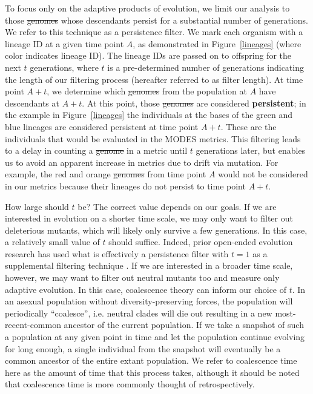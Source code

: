 \documentclass[letterpaper]{article}
\providecommand{\DIFaddtex}[1]{{\protect\color{blue}\uwave{#1}}} %
\providecommand{\DIFdeltex}[1]{{\protect\color{red}\sout{#1}}}                      %
\providecommand{\DIFaddbegin}{} %
\providecommand{\DIFaddend}{} %
\providecommand{\DIFdelbegin}{} %
\providecommand{\DIFdelend}{} %
\providecommand{\DIFadd}[1]{\texorpdfstring{\DIFaddtex{#1}}{#1}} %
\providecommand{\DIFdel}[1]{\texorpdfstring{\DIFdeltex{#1}}{}} %
\begin{document}
To focus only on the adaptive products of evolution, we limit our analysis to those \DIFdelbegin \DIFdel{genomes }\DIFdelend \DIFaddbegin \DIFadd{components }\DIFaddend whose descendants persist for a substantial number of generations. We refer to this technique as a persistence filter. We mark each organism with a lineage ID at a given time point $A$, as demonstrated in Figure~\ref{lineages} (where color indicates lineage ID). The lineage IDs are passed on to offspring for the next $t$ generations, where $t$ is a pre-determined number of generations indicating the length of our filtering process (hereafter referred to as filter length). At time point $A+t$, we determine which \DIFdelbegin \DIFdel{genomes }\DIFdelend \DIFaddbegin \DIFadd{components }\DIFaddend from the population at $A$ have descendants at $A+t$. At this point, those \DIFdelbegin \DIFdel{genomes }\DIFdelend \DIFaddbegin \DIFadd{components }\DIFaddend are considered \textbf{persistent}; in the example in Figure~\ref{lineages} the individuals at the bases of the green and blue lineages are considered persistent at time point $A+t$. These are the individuals that would be evaluated in the MODES metrics. This filtering leads to a delay in counting a \DIFdelbegin \DIFdel{genome }\DIFdelend \DIFaddbegin \DIFadd{component }\DIFaddend in a metric until $t$ generations later, but enables us to avoid an apparent increase in metrics due to drift via mutation. For example, the red and orange \DIFdelbegin \DIFdel{genomes }\DIFdelend \DIFaddbegin \DIFadd{components }\DIFaddend from time point $A$ would not be considered in our metrics because their lineages do not persist to time point $A+t$.

How large should $t$ be? The correct value depends on our goals. If we are interested in evolution on a shorter time scale, we may only want to filter out deleterious mutants, which will likely only survive a few generations. In this case, a relatively small value of $t$ should suffice. Indeed, prior open-ended evolution research has used what is effectively a persistence filter with $t = 1$ as a supplemental filtering technique \citep{channon_improving_2003}. If we are interested in a broader time scale, however, we may want to filter out neutral mutants too and measure only adaptive evolution. In this case, coalescence theory can inform our choice of $t$. In an asexual population without diversity-preserving forces, the population will periodically ``coalesce'', i.e. neutral clades will die out resulting in a new most-recent-common ancestor of the current population. If we take a snapshot of such a population at any given point in time and let the population continue evolving for long enough,  a single individual from the snapshot will eventually be a common ancestor of the entire extant population. We refer to coalescence time here as the amount of time that this process takes, although it should be noted that coalescence time is more commonly thought of retrospectively. 
\end{document}
